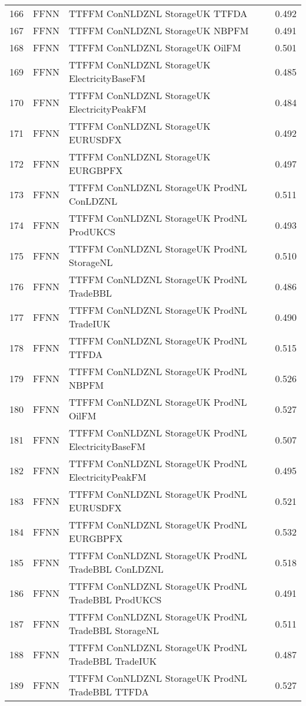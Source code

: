 \begin{table}[ht]
\begin{tabular}{rllr}
  166 & FFNN & TTFFM ConNLDZNL StorageUK TTFDA & 0.492 \\ 
  167 & FFNN & TTFFM ConNLDZNL StorageUK NBPFM & 0.491 \\ 
  168 & FFNN & TTFFM ConNLDZNL StorageUK OilFM & 0.501 \\ 
  169 & FFNN & TTFFM ConNLDZNL StorageUK ElectricityBaseFM & 0.485 \\ 
  170 & FFNN & TTFFM ConNLDZNL StorageUK ElectricityPeakFM & 0.484 \\ 
  171 & FFNN & TTFFM ConNLDZNL StorageUK EURUSDFX & 0.492 \\ 
  172 & FFNN & TTFFM ConNLDZNL StorageUK EURGBPFX & 0.497 \\ 
  173 & FFNN & TTFFM ConNLDZNL StorageUK ProdNL ConLDZNL & 0.511 \\ 
  174 & FFNN & TTFFM ConNLDZNL StorageUK ProdNL ProdUKCS & 0.493 \\ 
  175 & FFNN & TTFFM ConNLDZNL StorageUK ProdNL StorageNL & 0.510 \\ 
  176 & FFNN & TTFFM ConNLDZNL StorageUK ProdNL TradeBBL & 0.486 \\ 
  177 & FFNN & TTFFM ConNLDZNL StorageUK ProdNL TradeIUK & 0.490 \\ 
  178 & FFNN & TTFFM ConNLDZNL StorageUK ProdNL TTFDA & 0.515 \\ 
  179 & FFNN & TTFFM ConNLDZNL StorageUK ProdNL NBPFM & 0.526 \\ 
  180 & FFNN & TTFFM ConNLDZNL StorageUK ProdNL OilFM & 0.527 \\ 
  181 & FFNN & TTFFM ConNLDZNL StorageUK ProdNL ElectricityBaseFM & 0.507 \\ 
  182 & FFNN & TTFFM ConNLDZNL StorageUK ProdNL ElectricityPeakFM & 0.495 \\ 
  183 & FFNN & TTFFM ConNLDZNL StorageUK ProdNL EURUSDFX & 0.521 \\ 
  184 & FFNN & TTFFM ConNLDZNL StorageUK ProdNL EURGBPFX & 0.532 \\ 
  185 & FFNN & TTFFM ConNLDZNL StorageUK ProdNL TradeBBL ConLDZNL & 0.518 \\ 
  186 & FFNN & TTFFM ConNLDZNL StorageUK ProdNL TradeBBL ProdUKCS & 0.491 \\ 
  187 & FFNN & TTFFM ConNLDZNL StorageUK ProdNL TradeBBL StorageNL & 0.511 \\ 
  188 & FFNN & TTFFM ConNLDZNL StorageUK ProdNL TradeBBL TradeIUK & 0.487 \\ 
  189 & FFNN & TTFFM ConNLDZNL StorageUK ProdNL TradeBBL TTFDA & 0.527 \\ 

\end{tabular}
\end{table}
